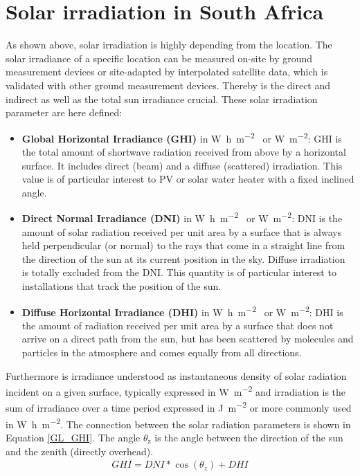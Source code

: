 \section{Solar irradiation in South Africa}
As shown above, solar irradiation is highly depending from the location. The solar irradiance of a specific location can be measured on-site by ground measurement devices or site-adapted by interpolated satellite data, which is validated with other ground measurement devices. Thereby is the direct and indirect as well as the total sun irradiance crucial. These solar irradiation parameter are here defined:
\begin{itemize}
\item \textbf{Global Horizontal Irradiance (GHI)} in \si{\watt\hour\per\square\metre\year} or \si{\watt\per\square\metre}: GHI is the total amount of shortwave radiation received from above by a horizontal surface. It includes direct (beam) and a diffuse (scattered) irradiation. This value is of particular interest to PV or solar water heater with a fixed inclined angle.
\item \textbf{Direct Normal Irradiance (DNI)} in \si{\watt\hour\per\square\metre\year} or \si{\watt\per\square\metre}: DNI is the amount of solar radiation received per unit area by a surface that is always held perpendicular (or normal) to the rays that come in a straight line from the direction of the sun at its current position in the sky. Diffuse irradiation is totally excluded from the DNI. This quantity is of particular interest to  installations that track the position of the sun.
\item \textbf{Diffuse Horizontal Irradiance (DHI)} in \si{\watt\hour\per\square\metre\year} or \si{\watt\per\square\metre}: DHI is the amount of radiation received per unit area by a surface that does not arrive on a direct path from the sun, but has been scattered by molecules and particles in the atmosphere and comes equally from all directions.
\end{itemize}
Furthermore is irradiance understood as instantaneous density of solar radiation incident on a given surface, typically expressed in \si{\watt\per\square\metre} and irradiation is the sum of irradiance over a time period expressed in \si{\joule\per\square\metre} or more commonly used in \si{\watt\hour\per\square\metre}. The connection between the solar radiation parameters is shown in Equation \ref{GL_GHI}. The angle $\theta_\text{z}$ is the angle between the direction of the sun and the zenith (directly overhead).
\begin{align}
GHI=DNI*\cos(\theta_{z})+DHI \label{GL_GHI}
\end{align}
